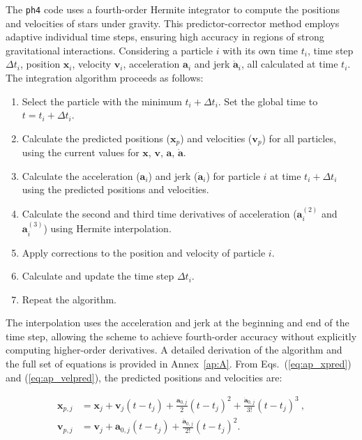 The \texttt{ph4} code uses a fourth-order Hermite integrator \citep{makino1992} to compute the positions and velocities of stars under gravity. This predictor-corrector method employs adaptive individual time steps, ensuring high accuracy in regions of strong gravitational interactions. Considering a particle $i$ with its own time $t_i$, time step $\Delta t_i$, position $\mathbf{x}_i$, velocity $\mathbf{v}_i$, acceleration $\mathbf{a}_i$ and jerk $\dot{\mathbf{a}}_i$, all calculated at time $t_i$. The integration algorithm proceeds as follows:

\begin{enumerate}
	\item Select the particle with the minimum $t_i + \Delta t_i$. Set the global time to $t=t_i + \Delta t_i$.
	\item Calculate the predicted positions ($\mathbf{x}_p$) and velocities ($\mathbf{v}_p$) for all particles, using the current values for $\mathbf{x}$, $\mathbf{v}$, $\mathbf{a}$, $\dot{\mathbf{a}}$. 
	\item Calculate the acceleration ($\mathbf{a}_i$) and jerk ($\dot{\mathbf{a}}_i$) for particle $i$ at time $t_i + \Delta t_i$ using the predicted positions and velocities.
	\item Calculate the second and third time derivatives of acceleration ($\mathbf{a}_i^{(2)}$ and $\mathbf{a}_i^{(3)}$) using Hermite interpolation.
	\item Apply corrections to the position and velocity of particle $i$.
	\item Calculate and update the time step $\Delta t_i$.
	\item Repeat the algorithm.
\end{enumerate}

The interpolation uses the acceleration and jerk at the beginning and end of the time step, allowing the scheme to achieve fourth-order accuracy without explicitly computing higher-order derivatives. A detailed derivation of the algorithm and the full set of equations is provided in Annex~\ref{ap:A}. From Eqs.~(\ref{eq:ap_xpred}) and (\ref{eq:ap_velpred}), the predicted positions and velocities are:

\begin{align}
	\mathbf{x}_{p, j} &= \mathbf{x}_j + \mathbf{v}_j (t - t_j) + \frac{\mathbf{a}_{0,j}}{2} (t - t_j)^2 + \frac{\dot{\mathbf{a}}_{0,j}}{3!} (t - t_j)^3~, \\
	\mathbf{v}_{p, j} &= \mathbf{v}_j + \mathbf{a}_{0,j} (t - t_j) + \frac{\dot{\mathbf{a}}_{0,j}}{2!} (t - t_j)^2.
\end{align}

